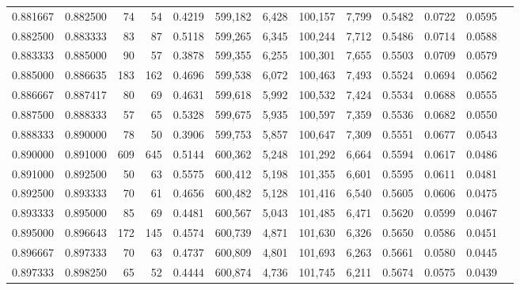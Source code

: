 \begin{tabular}{rrrrrrrrrrrrr}
0.881667 & 0.882500 &    74 &  54 &                                     0.4219 & 599,182 &   6,428 & 100,157 &   7,799 & 0.5482 & 0.0722 & 0.0595 \\
0.882500 & 0.883333 &    83 &  87 &                                     0.5118 & 599,265 &   6,345 & 100,244 &   7,712 & 0.5486 & 0.0714 & 0.0588 \\
0.883333 & 0.885000 &    90 &  57 &                                     0.3878 & 599,355 &   6,255 & 100,301 &   7,655 & 0.5503 & 0.0709 & 0.0579 \\
0.885000 & 0.886635 &   183 & 162 &                                     0.4696 & 599,538 &   6,072 & 100,463 &   7,493 & 0.5524 & 0.0694 & 0.0562 \\
0.886667 & 0.887417 &    80 &  69 &                                     0.4631 & 599,618 &   5,992 & 100,532 &   7,424 & 0.5534 & 0.0688 & 0.0555 \\
0.887500 & 0.888333 &    57 &  65 &                                     0.5328 & 599,675 &   5,935 & 100,597 &   7,359 & 0.5536 & 0.0682 & 0.0550 \\
0.888333 & 0.890000 &    78 &  50 &                                     0.3906 & 599,753 &   5,857 & 100,647 &   7,309 & 0.5551 & 0.0677 & 0.0543 \\
0.890000 & 0.891000 &   609 & 645 &                                     0.5144 & 600,362 &   5,248 & 101,292 &   6,664 & 0.5594 & 0.0617 & 0.0486 \\
0.891000 & 0.892500 &    50 &  63 &                                     0.5575 & 600,412 &   5,198 & 101,355 &   6,601 & 0.5595 & 0.0611 & 0.0481 \\
0.892500 & 0.893333 &    70 &  61 &                                     0.4656 & 600,482 &   5,128 & 101,416 &   6,540 & 0.5605 & 0.0606 & 0.0475 \\
0.893333 & 0.895000 &    85 &  69 &                                     0.4481 & 600,567 &   5,043 & 101,485 &   6,471 & 0.5620 & 0.0599 & 0.0467 \\
0.895000 & 0.896643 &   172 & 145 &                                     0.4574 & 600,739 &   4,871 & 101,630 &   6,326 & 0.5650 & 0.0586 & 0.0451 \\
0.896667 & 0.897333 &    70 &  63 &                                     0.4737 & 600,809 &   4,801 & 101,693 &   6,263 & 0.5661 & 0.0580 & 0.0445 \\
0.897333 & 0.898250 &    65 &  52 &                                     0.4444 & 600,874 &   4,736 & 101,745 &   6,211 & 0.5674 & 0.0575 & 0.0439 \\

\end{tabular}
